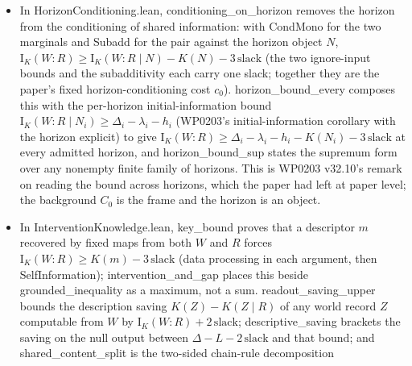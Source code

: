 \documentclass[11pt,a4paper]{article}
\newcommand{\lean}[1]{{\ttfamily\small
  \let\leanunderscore\_\def\_{\leanunderscore\allowbreak}#1}}
\newcommand{\Ik}{\mathrm{I}_K}
\begin{document}
\begin{itemize}[leftmargin=1.4em,itemsep=1pt]
$H_0=K(W\mid y_\varnothing)$.
With the relaxed \lean{RegulationBalance.CondMono},
\lean{excess\_nonneg} bounds the excess
$\varepsilon=I_K(W{:}R)-(\Delta-L)$ below by $-7s$.
\lean{art\_with\_residual} has lower exponent $-K(R)-L-H_0-8s$
and upper exponent $I_K(W{:}R)-K(R)-\Delta+s$;
\lean{art\_with\_residual\_specified} shifts both by the selected
program's length offset $-\delta$.
Their separation is $\varepsilon+H_0+9s$, before the distinct coding
constants are included. \lean{log2\_sandwich} takes logarithms and
retains the terms $-\log_2 c_2$ and $-\log_2 c_1$ at the two endpoints.
This is WP0203's ``Algorithmic
Regulator Theorem: exact form'': the posterior charges the residual bit for bit, which is why
the clamp family ($2^N$ worlds at $2^{-N}$ each) defeats the aggregate tail and why
conditioning on the residual repairs it.
\item In \lean{HorizonConditioning.lean}, \lean{conditioning\_on\_horizon} removes the
horizon from the conditioning of shared information: with \lean{CondMono} for the two
marginals and \lean{Subadd} for the pair against the horizon object $N$,
$\Ik(W{:}R)\ge\Ik(W{:}R\mid N)-K(N)-3\,\mathrm{slack}$ (the two ignore-input bounds and the
subadditivity each carry one slack; together they are the paper's fixed horizon-conditioning
cost $c_0$). \lean{horizon\_bound\_every} composes
this with the per-horizon initial-information bound $\Ik(W{:}R\mid N_i)\ge\Delta_i-\lambda_i-h_i$
(WP0203's initial-information corollary with the horizon explicit) to give
$\Ik(W{:}R)\ge\Delta_i-\lambda_i-h_i-K(N_i)-3\,\mathrm{slack}$ at every admitted horizon, and
\lean{horizon\_bound\_sup} states the supremum form over any nonempty finite family of horizons.
This is WP0203 v32.10's remark on reading the bound across horizons, which the paper had left at
paper level; the background $C_0$ is the frame and the horizon is an object.
\item In \lean{InterventionKnowledge.lean}, \lean{key\_bound} proves that a descriptor $m$
recovered by fixed maps from both $W$ and $R$ forces $\Ik(W{:}R)\ge K(m)-3\,\mathrm{slack}$
(data processing in each argument, then \lean{SelfInformation}); \lean{intervention\_and\_gap}
places this beside \lean{grounded\_inequality} as a maximum, not a sum.
\lean{readout\_saving\_upper} bounds the description saving $K(Z)-K(Z\mid R)$ of any world
record $Z$ computable from $W$ by $\Ik(W{:}R)+2\,\mathrm{slack}$; \lean{descriptive\_saving}
brackets the saving on the null output between $\Delta-L-2\,\mathrm{slack}$ and that bound; and
\lean{shared\_content\_split} is the two-sided chain-rule decomposition

\end{itemize}
\end{document}
